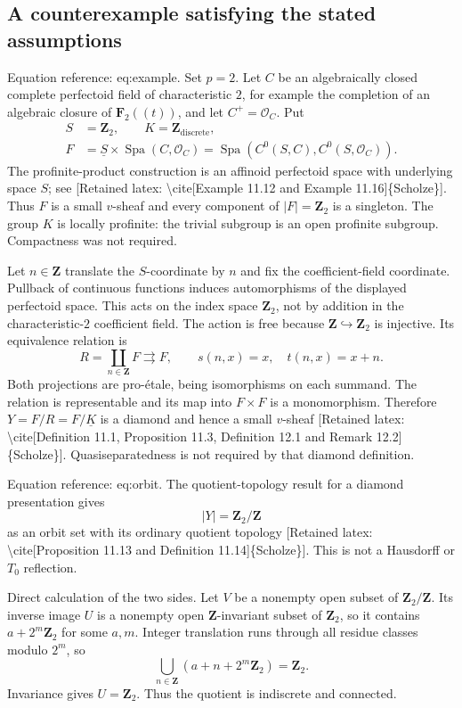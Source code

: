 \documentclass[10pt]{article}
\begin{document}
\subsection*{A counterexample satisfying the stated assumptions}
Equation reference: eq:example. Set \(p=2\). Let \(C\) be an algebraically closed complete perfectoid field of characteristic \(2\), for example the completion of an algebraic closure of \(\mathbf F_2((t))\), and let \(C^+=\mathcal O_C\). Put \[
\begin{split}
 S&=\mathbf Z_2,\qquad K=\mathbf Z_{\mathrm{discrete}},\\
 F&=\underline S\times\operatorname{Spa}(C,\mathcal O_C)
   =\operatorname{Spa}\!\left(C^0(S,C),C^0(S,\mathcal O_C)\right).
\end{split}\] The profinite-product construction is an affinoid perfectoid space with underlying space \(S\); see [Retained latex: \textbackslash{}cite[Example 11.12 and Example 11.16]\{Scholze\}]. Thus \(F\) is a small \(v\)-sheaf and every component of \(|F|=\mathbf Z_2\) is a singleton. The group \(K\) is locally profinite: the trivial subgroup is an open profinite subgroup. Compactness was not required.\par
Let \(n\in\mathbf Z\) translate the \(S\)-coordinate by \(n\) and fix the coefficient-field coordinate. Pullback of continuous functions induces automorphisms of the displayed perfectoid space. This acts on the index space \(\mathbf Z_2\), not by addition in the characteristic-\(2\) coefficient field. The action is free because \(\mathbf Z\hookrightarrow\mathbf Z_2\) is injective. Its equivalence relation is \[R=\coprod_{n\in\mathbf Z}F \rightrightarrows F,
 \qquad s(n,x)=x,\quad t(n,x)=x+n.\] Both projections are pro-étale, being isomorphisms on each summand. The relation is representable and its map into \(F\times F\) is a monomorphism. Therefore \(Y=F/R=F/\underline K\) is a diamond and hence a small \(v\)-sheaf [Retained latex: \textbackslash{}cite[Definition 11.1, Proposition 11.3, Definition 12.1 and Remark 12.2]\{Scholze\}]. Quasiseparatedness is not required by that diamond definition.\par
Equation reference: eq:orbit. The quotient-topology result for a diamond presentation gives \[
 |Y|=\mathbf Z_2/\mathbf Z\] as an orbit set with its ordinary quotient topology [Retained latex: \textbackslash{}cite[Proposition 11.13 and Definition 11.14]\{Scholze\}]. This is not a Hausdorff or \(T_0\) reflection.\par
Direct calculation of the two sides. Let \(V\) be a nonempty open subset of \(\mathbf Z_2/\mathbf Z\). Its inverse image \(U\) is a nonempty open \(\mathbf Z\)-invariant subset of \(\mathbf Z_2\), so it contains \(a+2^m\mathbf Z_2\) for some \(a,m\). Integer translation runs through all residue classes modulo \(2^m\), so \[\bigcup_{n\in\mathbf Z}(a+n+2^m\mathbf Z_2)=\mathbf Z_2.\] Invariance gives \(U=\mathbf Z_2\). Thus the quotient is indiscrete and connected.\par
\end{document}
